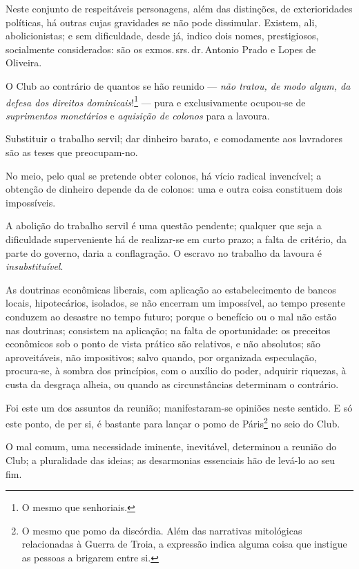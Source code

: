Neste conjunto de respeitáveis personagens, além das distinções, de
exterioridades políticas, há outras cujas gravidades se não pode
dissimular. Existem, ali, abolicionistas; e sem dificuldade, desde já,
indico dois nomes, prestigiosos, socialmente considerados: são os exmos.\,srs.\,dr.\,Antonio Prado e Lopes de Oliveira.

O Club ao contrário de quantos se hão reunido --- \emph{não tratou, de
modo algum, da defesa dos direitos dominicais}!\footnote{O mesmo que
  senhoriais.} --- pura e exclusivamente ocupou-se de \emph{suprimentos
monetários} e \emph{aquisição de colonos} para a lavoura.

Substituir o trabalho servil; dar dinheiro barato, e comodamente aos
lavradores são as teses que preocupam-no.

No meio, pelo qual se pretende obter colonos, há vício radical
invencível; a obtenção de dinheiro depende da de colonos: uma e outra
coisa constituem dois impossíveis.

A abolição do trabalho servil é uma questão pendente; qualquer que seja
a dificuldade superveniente há de realizar-se em curto prazo; a falta de
critério, da parte do governo, daria a conflagração. O escravo no
trabalho da lavoura é \emph{insubstituível}.

As doutrinas econômicas liberais, com aplicação ao estabelecimento de
bancos locais, hipotecários, isolados, se não encerram um impossível, ao
tempo presente conduzem ao desastre no tempo futuro; porque o benefício
ou o mal não estão nas doutrinas; consistem na aplicação; na falta de
oportunidade: os preceitos econômicos sob o ponto de vista prático são
relativos, e não absolutos; são aproveitáveis, não impositivos; salvo
quando, por organizada especulação, procura-se, à sombra dos princípios,
com o auxílio do poder, adquirir riquezas, à custa da desgraça alheia,
ou quando as circunstâncias determinam o contrário.

Foi este um dos assuntos da reunião; manifestaram-se opiniões neste
sentido. E só este ponto, de per si, é bastante para lançar o pomo de
Páris\footnote{O mesmo que pomo da discórdia. Além das narrativas
  mitológicas relacionadas à Guerra de Troia, a expressão indica alguma
  coisa que instigue as pessoas a brigarem entre si.} no seio do Club.

O mal comum, uma necessidade iminente, inevitável, determinou a reunião
do Club; a pluralidade das ideias; as desarmonias essenciais hão de
levá-lo ao seu fim.

